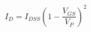 \documentclass[preview]{standalone}
\begin{document}
\begin{align*}
I_D = I_{DSS}(1-\dfrac{V_{GS}}{V_P})^2
\end{align*}
\end{document}
